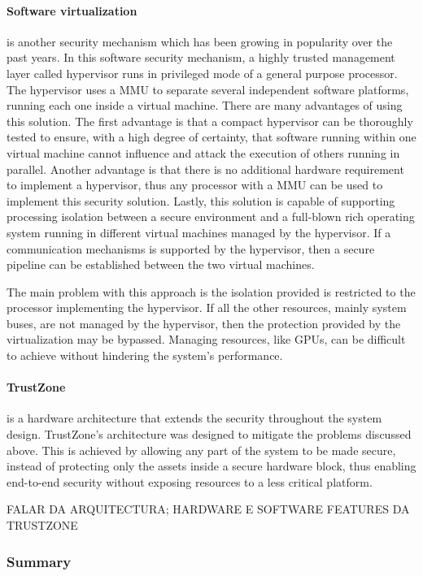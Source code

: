 \paragraph{\textbf{Software virtualization}} is another security mechanism which has been growing in popularity over the past years. In this software security mechanism, a highly trusted management layer called hypervisor runs in privileged mode of a general purpose processor. The hypervisor uses a \ac{MMU} to separate several independent software platforms, running each one inside a virtual machine. There are many advantages of using this solution. The first advantage is that a compact hypervisor can be thoroughly tested to ensure, with a high degree of certainty, that software running within one virtual machine cannot influence and attack the execution of others running in parallel. Another advantage is that there is no additional hardware requirement to implement a hypervisor, thus any processor with a \ac{MMU} can be used to implement this security solution. Lastly, this solution is capable of supporting processing isolation between a secure environment and a full-blown rich operating system running in different virtual machines managed by the hypervisor. If a communication mechanisms is supported by the hypervisor, then a secure pipeline can be established between the two virtual machines.

The main problem with this approach is the isolation provided is restricted to the processor implementing the hypervisor. If all the other resources, mainly system buses, are not managed by the hypervisor, then the protection provided by the virtualization may be bypassed. Managing resources, like \ac{GPUs}, can be difficult to achieve without hindering the system's performance.

\paragraph{\textbf{TrustZone}} is a hardware architecture that extends the security throughout the system design. TrustZone's architecture was designed to mitigate the problems discussed above. This is achieved by allowing any part of the system to be made secure, instead of protecting only the assets inside a secure hardware block, thus enabling end-to-end security without exposing resources to a less critical platform.

FALAR DA ARQUITECTURA; HARDWARE E SOFTWARE FEATURES DA TRUSTZONE

\subsubsection{Summary}

